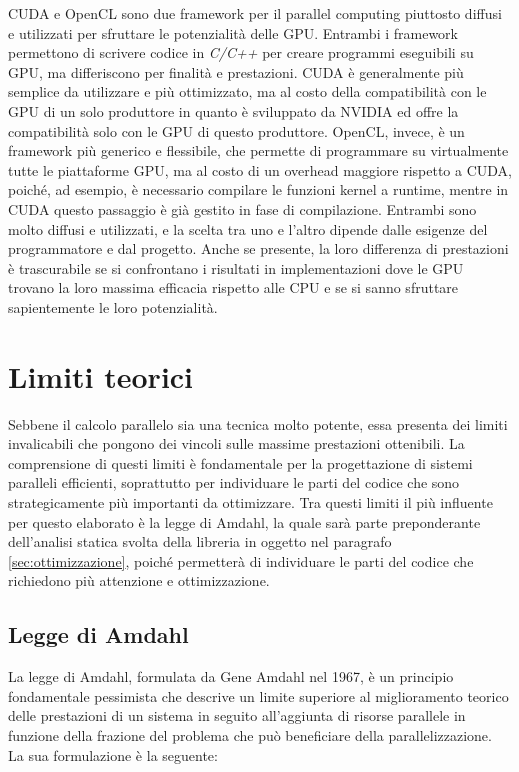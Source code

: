CUDA e OpenCL sono due framework per il parallel computing piuttosto diffusi e
utilizzati per sfruttare le potenzialità delle GPU. Entrambi i framework permettono
di scrivere codice in \textit{C/C++} per creare programmi eseguibili su GPU, ma differiscono
per finalità e prestazioni. CUDA è generalmente più semplice da utilizzare e più
ottimizzato, ma al costo della compatibilità con le GPU di un solo produttore in
quanto è sviluppato da NVIDIA ed offre la compatibilità solo con le GPU di questo
produttore. OpenCL, invece, è un framework più generico e flessibile, che permette
di programmare su virtualmente tutte le piattaforme GPU, ma al costo di un overhead
maggiore rispetto a CUDA, poiché, ad esempio, è necessario compilare le funzioni
kernel a runtime, mentre in CUDA questo passaggio è già gestito in fase di compilazione.
Entrambi sono molto diffusi e utilizzati, e la scelta tra uno e l'altro dipende dalle
esigenze del programmatore e dal progetto. Anche se presente, la loro differenza
di prestazioni è trascurabile se si confrontano i risultati in implementazioni dove
le GPU trovano la loro massima efficacia rispetto alle CPU e se si sanno sfruttare
sapientemente le loro potenzialità.

\section{Limiti teorici}
\label{sec:limititeorici}

Sebbene il calcolo parallelo sia una tecnica molto potente, essa presenta dei limiti
invalicabili che pongono dei vincoli sulle massime prestazioni ottenibili. La
comprensione di questi limiti è fondamentale per la progettazione di sistemi
paralleli efficienti, soprattutto per individuare le parti del codice che sono strategicamente
più importanti da ottimizzare. Tra questi limiti il più influente per questo
elaborato è la legge di Amdahl, la quale sarà parte preponderante dell'analisi statica
svolta della libreria in oggetto nel paragrafo \ref{sec:ottimizzazione}, poiché
permetterà di individuare le parti del codice che richiedono più attenzione e
ottimizzazione.

\subsection{Legge di Amdahl}
\label{sec:amdahl}

La legge di Amdahl, formulata da Gene Amdahl nel 1967, è un principio fondamentale
pessimista che descrive un limite superiore al miglioramento teorico delle prestazioni
di un sistema in seguito all'aggiunta di risorse parallele in funzione della frazione
del problema che può beneficiare della parallelizzazione. La sua formulazione è
la seguente:

